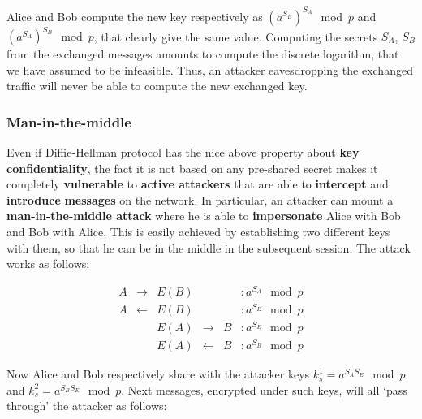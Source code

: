 Alice and Bob compute the new key respectively as $(a^{S_B})^{S_A} \mod p$ and $(a^{S_A})^{S_B} \mod p$, that clearly give the same value. Computing the secrets $S_A$, $S_B$ from the exchanged messages amounts to compute the discrete logarithm, that we have assumed to be infeasible. Thus, an attacker eavesdropping the exchanged traffic will never be able to compute the new exchanged key.



\subsubsection{Man-in-the-middle}
Even if Diffie-Hellman protocol has the nice above property about \textbf{key confidentiality}, the fact it is not based on any pre-shared secret makes it completely \textbf{vulnerable} to \textbf{active attackers} that are able to \textbf{intercept} and \textbf{introduce} \textbf{messages} on the network. In particular, an attacker can mount a \textbf{man-in-the-middle attack} where he is able to \textbf{impersonate} Alice with Bob and Bob with Alice. This is easily achieved by establishing two different keys with them, so that he can be in the middle in the subsequent session. The attack works as follows:

$$\begin{array}{cccccl} A  & \rightarrow &  E(B) & & &: a^{S_A} \mod p \\ A & \leftarrow & E(B) & & &: a^{S_E} \mod p \\ & & E(A)  & \rightarrow &  B &: a^{S_E} \mod p \\ & & E(A) & \leftarrow & B &: a^{S_B} \mod p \end{array}$$

Now Alice and Bob respectively share with the attacker keys $k_s^1 = a^{S_AS_E} \mod p$ and $k_s^2 = a^{S_BS_E} \mod p$. Next messages, encrypted under such keys, will all ‘pass through’ the attacker as follows:

